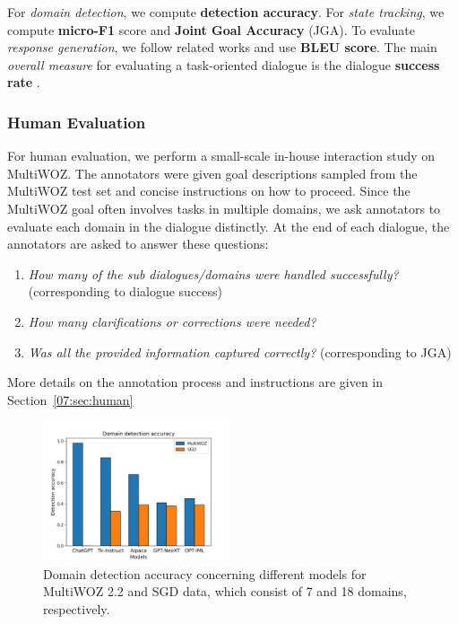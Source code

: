 For \emph{domain detection}, we compute \textbf{detection accuracy}.
For \emph{state tracking}, we compute \textbf{micro-F1} score and \textbf{Joint Goal Accuracy} (JGA).
To evaluate \emph{response generation}, we follow related works and use \textbf{BLEU score}.
The main \emph{overall measure} for evaluating a task-oriented dialogue is the dialogue \textbf{success rate} \cite{deriu_survey_2021}.

\subsubsection*{Human Evaluation}
For human evaluation, we perform a small-scale in-house interaction study on MultiWOZ.
The annotators were given goal descriptions sampled from the MultiWOZ test set and concise instructions on how to proceed.
Since the MultiWOZ goal often involves tasks in multiple domains, we ask annotators to evaluate each domain in the dialogue distinctly.
At the end of each dialogue, the annotators are asked to answer these questions:
\begin{enumerate}
    \item \emph{How many of the sub dialogues/domains were handled successfully?} (corresponding to dialogue success)
    \item \emph{How many clarifications or corrections were needed?}
    \item \emph{Was all the provided information captured correctly?} (corresponding to JGA)
\end{enumerate}
More details on the annotation process and instructions are given in Section~\ref{07:sec:human}

\begin{figure}[h]
    \centering
    \includegraphics[width=0.49\textwidth]{images/domain-detections.png}
    \caption{Domain detection accuracy concerning different models for MultiWOZ 2.2 and SGD data, which consist of 7 and 18 domains, respectively.}
    \label{07:fig:domains}
\end{figure}


